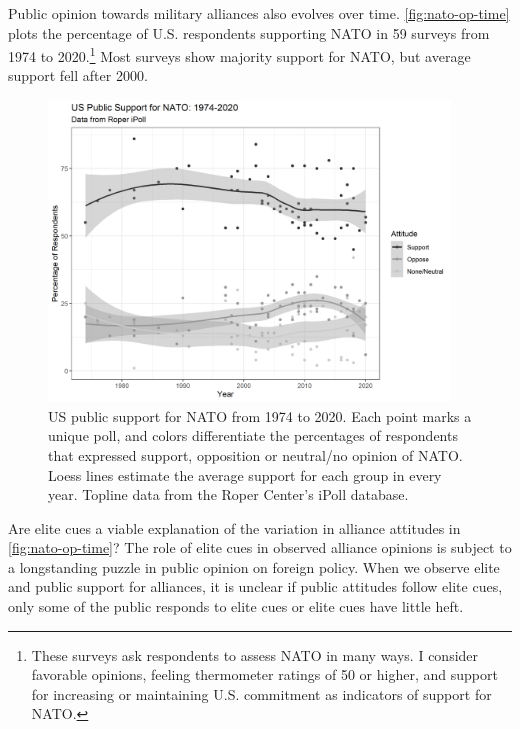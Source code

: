 \documentclass[12pt]{article}
\begin{document}
Public opinion towards military alliances also evolves over time. 
\autoref{fig:nato-op-time} plots the percentage of U.S. respondents supporting NATO in 59 surveys from 1974 to 2020.\footnote{These surveys ask respondents to assess NATO in many ways. I consider favorable opinions, feeling thermometer ratings of 50 or higher, and support for increasing or maintaining U.S. commitment as indicators of support for NATO.} 
Most surveys show majority support for NATO, but average support fell after 2000.  


\begin{figure}
	\centering
		\includegraphics[width=0.95\textwidth]{../figures/nato-op-time.png}
	\caption{US public support for NATO from 1974 to 2020. Each point marks a unique poll, and colors differentiate the percentages of respondents that expressed support, opposition or neutral/no opinion of NATO. Loess lines estimate the average support for each group in every year. Topline data from the Roper Center's iPoll database.}
	\label{fig:nato-op-time}
\end{figure}


Are elite cues a viable explanation of the variation in alliance attitudes in \autoref{fig:nato-op-time}? 
The role of elite cues in observed alliance opinions is subject to a longstanding puzzle in public opinion on foreign policy.
When we observe elite and public support for alliances, it is unclear if public attitudes follow elite cues, only some of the public responds to elite cues or elite cues have little heft. 
\end{document}
